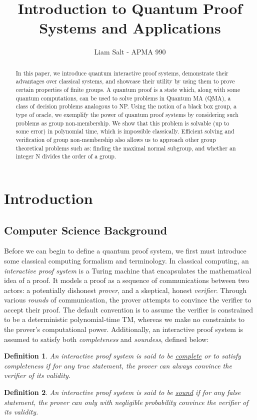 \documentclass[12pt]{article}
\title{Introduction to Quantum Proof Systems and Applications}
\author{Liam Salt - APMA 990}
\newtheorem*{defn}{Definition}
\begin{document}
	\maketitle
	
	\begin{abstract}
		In this paper, we introduce quantum interactive proof systems, demonstrate their advantages over classical systems, and showcase their utility by using them to prove certain properties of finite groups. A quantum proof is a state which, along with some quantum computations, can be used to solve problems in Quantum MA (QMA),  a class of decision problems analogous to NP. Using the notion of a black box group, a type of oracle, we exemplify the power of quantum proof systems by considering such problems as group non-membership. We show that this problem is solvable (up to some error) in polynomial time, which is impossible classically. Efficient solving and verification of group non-membership also allows us to approach other group theoretical problems such as: finding the maximal normal subgroup, and whether an integer N divides the order of a group.
	\end{abstract}
	\tableofcontents
	\section{Introduction}
	
	\subsection{Computer Science Background}
	
	Before we can begin to define a quantum proof system, we first must introduce some classical computing formalism and terminology. In classical computing, an \textit{interactive proof system} is a Turing machine that encapsulates the mathematical idea of a proof. It models a proof as a sequence of communications between two actors: a potentially dishonest \textit{prover}, and a skeptical, honest \textit{verifier}. Through various \textit{rounds} of communication, the prover attempts to convince the verifier to accept their proof. The default convention is to assume the verifier is constrained to be a deterministic polynomial-time TM, whereas we make no constraints to the prover's computational power. Additionally, an interactive proof system is assumed to satisfy both \textit{completeness} and \textit{soundess}, defined below:
	\begin{defn}
		An interactive proof system is said to be \underline{complete} or to satisfy completeness if for any true statement, the prover can always convince the verifier of its validity.
	\end{defn}
	\begin{defn} An interactive proof system is said to be \underline{sound} if for any false statement, the prover can only with negligible probability convince the verifier of its validity.
	\end{defn}
\end{document}
